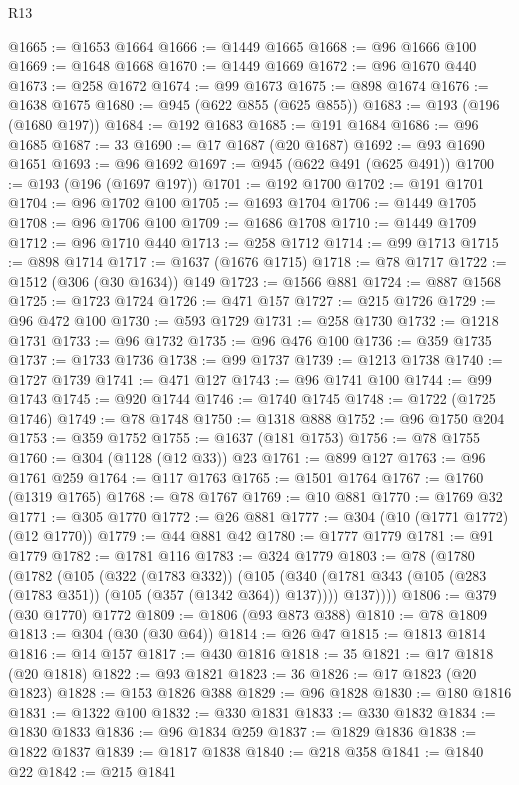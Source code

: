 \begin{lexlean}{R13}
\begin{coremodule}
@1665 := @1653 @1664
@1666 := @1449 @1665
@1668 := @96 @1666 @100
@1669 := @1648 @1668
@1670 := @1449 @1669
@1672 := @96 @1670 @440
@1673 := @258 @1672
@1674 := @99 @1673
@1675 := @898 @1674
@1676 := @1638 @1675
@1680 := @945 (@622 @855 (@625 @855))
@1683 := @193 (@196 (@1680 @197))
@1684 := @192 @1683
@1685 := @191 @1684
@1686 := @96 @1685
@1687 := 33
@1690 := @17 @1687 (@20 @1687)
@1692 := @93 @1690 @1651
@1693 := @96 @1692
@1697 := @945 (@622 @491 (@625 @491))
@1700 := @193 (@196 (@1697 @197))
@1701 := @192 @1700
@1702 := @191 @1701
@1704 := @96 @1702 @100
@1705 := @1693 @1704
@1706 := @1449 @1705
@1708 := @96 @1706 @100
@1709 := @1686 @1708
@1710 := @1449 @1709
@1712 := @96 @1710 @440
@1713 := @258 @1712
@1714 := @99 @1713
@1715 := @898 @1714
@1717 := @1637 (@1676 @1715)
@1718 := @78 @1717
@1722 := @1512 (@306 (@30 @1634)) @149
@1723 := @1566 @881
@1724 := @887 @1568
@1725 := @1723 @1724
@1726 := @471 @157
@1727 := @215 @1726
@1729 := @96 @472 @100
@1730 := @593 @1729
@1731 := @258 @1730
@1732 := @1218 @1731
@1733 := @96 @1732
@1735 := @96 @476 @100
@1736 := @359 @1735
@1737 := @1733 @1736
@1738 := @99 @1737
@1739 := @1213 @1738
@1740 := @1727 @1739
@1741 := @471 @127
@1743 := @96 @1741 @100
@1744 := @99 @1743
@1745 := @920 @1744
@1746 := @1740 @1745
@1748 := @1722 (@1725 @1746)
@1749 := @78 @1748
@1750 := @1318 @888
@1752 := @96 @1750 @204
@1753 := @359 @1752
@1755 := @1637 (@181 @1753)
@1756 := @78 @1755
@1760 := @304 (@1128 (@12 @33)) @23
@1761 := @899 @127
@1763 := @96 @1761 @259
@1764 := @117 @1763
@1765 := @1501 @1764
@1767 := @1760 (@1319 @1765)
@1768 := @78 @1767
@1769 := @10 @881
@1770 := @1769 @32
@1771 := @305 @1770
@1772 := @26 @881
@1777 := @304 (@10 (@1771 @1772) (@12 @1770))
@1779 := @44 @881 @42
@1780 := @1777 @1779
@1781 := @91 @1779
@1782 := @1781 @116
@1783 := @324 @1779
@1803 := @78
    (@1780
      (@1782
        (@105
          (@322 (@1783 @332))
          (@105
            (@340 (@1781 @343 (@105 (@283 (@1783 @351)) (@105 (@357 (@1342 @364)) @137))))
            @137))))
@1806 := @379 (@30 @1770) @1772
@1809 := @1806 (@93 @873 @388)
@1810 := @78 @1809
@1813 := @304 (@30 (@30 @64))
@1814 := @26 @47
@1815 := @1813 @1814
@1816 := @14 @157
@1817 := @430 @1816
@1818 := 35
@1821 := @17 @1818 (@20 @1818)
@1822 := @93 @1821
@1823 := 36
@1826 := @17 @1823 (@20 @1823)
@1828 := @153 @1826 @388
@1829 := @96 @1828
@1830 := @180 @1816
@1831 := @1322 @100
@1832 := @330 @1831
@1833 := @330 @1832
@1834 := @1830 @1833
@1836 := @96 @1834 @259
@1837 := @1829 @1836
@1838 := @1822 @1837
@1839 := @1817 @1838
@1840 := @218 @358
@1841 := @1840 @22
@1842 := @215 @1841

\end{coremodule}
\end{lexlean}
